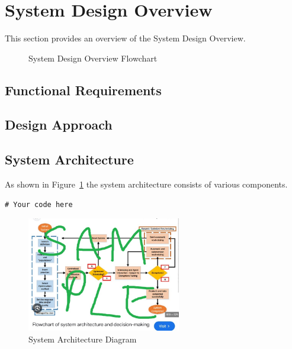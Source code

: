 \section{System Design Overview}
This section provides an overview of the System Design Overview.

\begin{figure}[H]
    \centering
    \scalebox{0.8}{ %
        
    }
    \caption{System Design Overview Flowchart}
    \label{fig:decriptiveLabel77} %
\end{figure}

\subsection{Functional Requirements}

\subsection{Design Approach}

\subsection{System Architecture}
As shown in Figure~\ref{fig:decriptiveLabel77} the system architecture consists of various components.

\begin{lstlisting}[style=cstyle, caption=System Architecture Code Example, label=lst:SystemArchitecture13]
# Your code here
\end{lstlisting}

\begin{figure}[htbp] %
    \centering
    \includegraphics[width=0.6\textwidth]{figures/methodology/system_architecture.jpg}
    \caption{System Architecture Diagram}
    \label{fig:system-architecture1}
\end{figure}